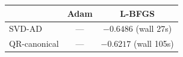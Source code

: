 \begin{tabular}{lcc}
\toprule
& Adam & L-BFGS \\
\midrule
SVD-AD       & --- & $-0.6486$  (wall 27s) \\
QR-canonical & --- & $-0.6217$  (wall 105s) \\
\bottomrule
\end{tabular}
